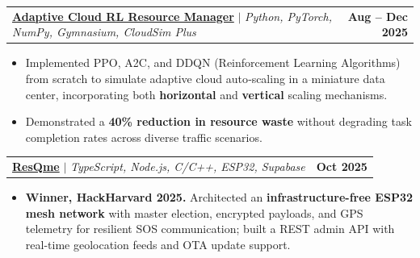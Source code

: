 \documentclass[letterpaper,10.5pt]{article}
\makeatletter
\newcommand{\projheading}[2]{%
  \vspace{2pt}%
  \begin{tabular*}{\textwidth}[t]{l@{\extracolsep{\fill}}r}
    \small #1 & \textbf{\small #2} \\
  \end{tabular*}%
}
\newcommand{\bul}[1]{%
  \item \small{#1}\vspace{-1pt}%
}
\newcommand{\bullist}{\begin{itemize}[leftmargin=12pt, label={\tiny$\bullet$}, topsep=1pt, itemsep=0pt, parsep=0pt]}
\newcommand{\stopbulls}{\end{itemize}\vspace{-2.75pt}}
\makeatother
\begin{document}
  
  
  

\projheading{\textbf{\href{https://github.com/l3hargav/CloudSim-Resource-Management-RL.git}{Adaptive Cloud RL Resource Manager}} $|$ \emph{Python, PyTorch, NumPy, Gymnasium, CloudSim Plus}}{Aug -- Dec 2025}
\bullist
  \bul{Implemented PPO, A2C, and DDQN (Reinforcement Learning Algorithms) from scratch to simulate adaptive cloud auto‑scaling in a miniature data center, incorporating both \textbf{horizontal} and \textbf{vertical} scaling mechanisms.}
  \bul{Demonstrated a \textbf{40\% reduction in resource waste} without degrading task completion rates across diverse traffic scenarios.}
\stopbulls
\vspace{3pt}


\projheading{\textbf{\href{https://devpost.com/software/resqme-jq52al}{ResQme}} $|$ \emph{TypeScript, Node.js, C/C++, ESP32, Supabase}}{Oct 2025}
\bullist
  \bul{\textbf{Winner, HackHarvard 2025.} Architected an \textbf{infrastructure-free ESP32 mesh network} with master election, encrypted payloads, and GPS telemetry for resilient SOS communication; built a REST admin API with real-time geolocation feeds and OTA update support.}
\stopbulls
\end{document}
